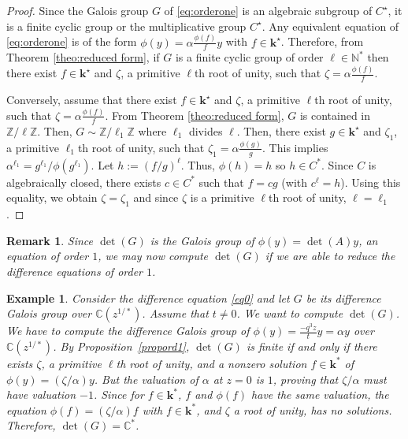 \documentclass[a4paper,11pt]{amsart}
\newtheorem{rem}[thm]{Remark}
\newtheorem{ex}[thm]{Example}
\def\k{\mathbf{k}}
\def\Z{\mathbb{Z}}
\def\C{\mathbb{C}}
\begin{document}
\begin{proof}
Since the Galois group $G$ of \eqref{eq:orderone} is an algebraic subgroup of $C^{\star}$, it is a finite cyclic group or the multiplicative group $C^{\star}$. 
Any equivalent equation of \eqref{eq:orderone} is of the form $\phi(y)=\alpha\frac{\phi(f)}{f}y$ with $f\in\k^{\star}$. 
Therefore, from Theorem \ref{theo:reduced form}, if $G$ is a finite cyclic group of order $\ell\in\mathbb{N}^*$ then there exist $f\in\k^{\star}$ and $\zeta$, a primitive $\ell$th root of unity,  such that $\zeta= \alpha\frac{\phi(f)}{f}$. \par Conversely, assume that there exist $f\in\k^{\star}$ and $\zeta$, a primitive $\ell$th root of unity,  such that $\zeta= \alpha\frac{\phi(f)}{f}$. From Theorem \ref{theo:reduced form}, $G$ is contained in $\Z/\ell\Z$. Then,  
$G\sim \Z/\ell_1\Z$ where $\ell_1$ divides $\ell$. Then, there exist $g\in\k^{\star}$ and $\zeta_1$, a primitive $\ell_1$th root of unity,  such that $\zeta_1= \alpha\frac{\phi(g)}{g}$. This implies $\alpha^{\ell_1}=g^{\ell_1}/\phi(g^{\ell_1})$. Let $h:=(f/g)^{\ell}$. Thus, $\phi(h) = h$ so $h\in C^*$. Since $C$ is algebraically closed, there exists $c\in C^*$ such that $f=cg$ (with $c^{\ell} = h$). Using this equality, we obtain $\zeta = \zeta_1$ and since $\zeta$ is a primitive $\ell$th root of unity, $\ell=\ell_1$.
\end{proof}


\begin{rem}
Since $\det(G)$ is the Galois group of $\phi (y)=\det (A)y$, an equation of order $1$, we may now compute $\det(G)$ if we are able to reduce the  difference equations of order $1$.
\end{rem}

\begin{ex}\label{ex3}
Consider the difference equation \eqref{eq0} and let $G$ be its difference Galois group over $\C(z^{1/*})$. Assume that $t\neq 0$. We want to compute $\det(G)$.  We have to compute the difference Galois group of $\phi(y)=\frac{-q^3 z}{t}y=\alpha y$ over $\C(z^{1/*})$.  By Proposition~\ref{propord1},  $\det(G)$ is finite if and only if there exists $\zeta$, a primitive $\ell$th root of unity, and a nonzero solution $f\in \k^*$ of  $\phi(y)=(\zeta/\alpha)y$.  But the valuation of $\alpha$ at $z=0$ is $1$, proving that $\zeta/\alpha$ must have valuation $-1$. Since for $f\in\k^*$,  $f$ and $\phi(f)$ have the same valuation,  the equation $\phi(f)=(\zeta/\alpha)f$ with $f\in\k^*$, and $\zeta$ a root of unity,  has no solutions.  Therefore,  $\det(G)=\C^*$.
\end{ex}
\end{document}
